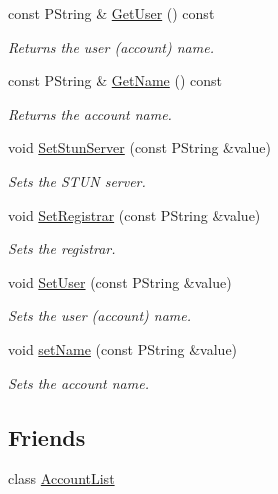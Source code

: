 \begin{CompactItemize}
const PString \& \hyperlink{classAccount_3e372dec415f99fea4aef62356c451c4}{GetUser} () const 
\begin{CompactList}\small\item\em Returns the user (account) name. \item\end{CompactList}\item 
const PString \& \hyperlink{classAccount_9e97a246120c9a1b032dee5a1182f59d}{GetName} () const 
\begin{CompactList}\small\item\em Returns the account name. \item\end{CompactList}\item 
void \hyperlink{classAccount_28e1cfe654d233bb5eea03ae64e030dd}{SetStunServer} (const PString \&value)
\begin{CompactList}\small\item\em Sets the STUN server. \item\end{CompactList}\item 
void \hyperlink{classAccount_94f9db7a225897c903475c42425b28b1}{SetRegistrar} (const PString \&value)
\begin{CompactList}\small\item\em Sets the registrar. \item\end{CompactList}\item 
void \hyperlink{classAccount_796dd94d9e20801be1fe352fae44095f}{SetUser} (const PString \&value)
\begin{CompactList}\small\item\em Sets the user (account) name. \item\end{CompactList}\item 
void \hyperlink{classAccount_b4f94471843ffe5c49ef919b7a4c5dfe}{setName} (const PString \&value)
\begin{CompactList}\small\item\em Sets the account name. \item\end{CompactList}\end{CompactItemize}
\subsection*{Friends}
\begin{CompactItemize}
\item 
class \hyperlink{classAccount_37d0b1f5892301dabdceb70a7ec55ca3}{AccountList}
\end{CompactItemize}


